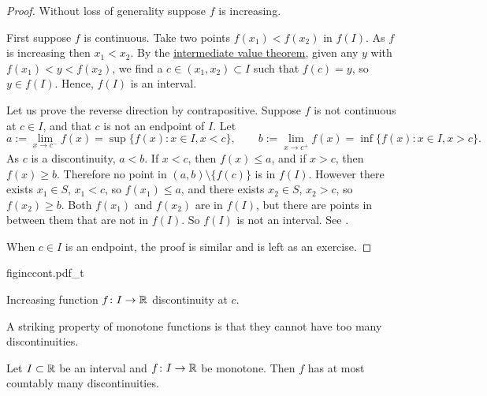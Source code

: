 \begin{proof}
Without loss of generality suppose $f$ is increasing.

First suppose $f$ is continuous.  Take two points
$f(x_1) < f(x_2)$ in $f(I)$.
As $f$ is increasing then $x_1 < x_2$.  By the
\hyperref[IVT:thm]{intermediate value theorem},
given any $y$ with $f(x_1) < y < f(x_2)$, we find
a $c \in (x_1,x_2) \subset I$ such that $f(c) = y$, so $y \in f(I)$. 
Hence, $f(I)$ is an interval.

Let us prove the reverse direction by contrapositive.
Suppose $f$ is not continuous at $c \in I$,
and that $c$ is not an endpoint of $I$.
Let
\begin{equation*}
a := \lim_{x \to c^-} f(x) = \sup \{ f(x) : x \in I, x < c \} ,
\qquad
b := \lim_{x \to c^+} f(x) = \inf \{ f(x) : x \in I, x > c \} .
\end{equation*}
As $c$ is a discontinuity, $a < b$.
If $x < c$, then $f(x) \leq a$, and
if $x > c$, then $f(x) \geq b$.  Therefore
no point
in $(a,b) \setminus \{ f(c) \}$ is in $f(I)$.
However there exists $x_1 \in S$, $x_1 < c$, so
$f(x_1) \leq a$, and there exists $x_2 \in S$, $x_2 > c$,
so $f(x_2) \geq b$.  Both $f(x_1)$ and $f(x_2)$ are in $f(I)$,
but there are points in between them that are not in $f(I)$.
So $f(I)$ is not an interval.  See .

When $c \in I$ is an endpoint, the proof is similar and is left as an exercise.
\end{proof}

\begin{myfigureht}
{figinccont.pdf_t}
\caption{Increasing function $f \colon I \to {\mathbb{R}}$ discontinuity at
$c$.\label{fig:figinccont}}
\end{myfigureht}

A striking property of monotone functions is that they cannot have
too many discontinuities.

\begin{cor} \label{cor:monotcountcont}
Let $I \subset {\mathbb{R}}$ be an interval and
$f \colon I \to {\mathbb{R}}$ be monotone.  Then $f$ has at most
countably many discontinuities.
\end{cor}

